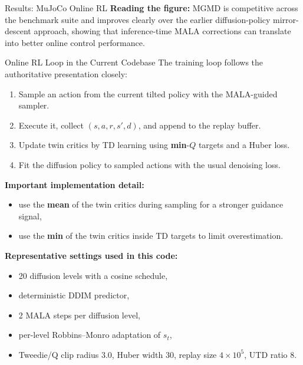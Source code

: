 \documentclass[final,hyperref={pdfpagelabels=false}]{beamer}
\newlength{\colwidth}
\begin{document}
\begin{frame}[t]
\begin{columns}[t]
\begin{column}{\colwidth}
\begin{block}{\Large Results: MuJoCo Online RL}
 \vspace{0.3em}
 \textbf{Reading the figure:}
 MGMD is competitive across the benchmark suite and improves clearly over the earlier diffusion-policy mirror-descent approach, showing that inference-time MALA corrections can translate into better online control performance.
 \end{block}
 
 \vspace{0.8cm}
 
 \begin{block}{\Large Online RL Loop in the Current Codebase}
 \small
 The training loop follows the authoritative presentation closely:
 \begin{enumerate}
      \item Sample an action from the current tilted policy with the MALA-guided sampler.
      \item Execute it, collect $(s,a,r,s',d)$, and append to the replay buffer.
      \item Update twin critics by TD learning using \textbf{min}-$Q$ targets and a Huber loss.
      \item Fit the diffusion policy to sampled actions with the usual denoising loss.
 \end{enumerate}
 
 \vspace{0.3em}
 \textbf{Important implementation detail:}
 \begin{itemize}
     \item use the \textbf{mean} of the twin critics during sampling for a stronger guidance signal,
     \item use the \textbf{min} of the twin critics inside TD targets to limit overestimation.
 \end{itemize}
 
 \vspace{0.3em}
 \textbf{Representative settings used in this code:}
 \begin{itemize}
     \item 20 diffusion levels with a cosine schedule,
     \item deterministic DDIM predictor,
     \item 2 MALA steps per diffusion level,
     \item per-level Robbins--Monro adaptation of $s_t$,
     \item Tweedie/Q clip radius $3.0$, Huber width $30$, replay size $4\times 10^5$, UTD ratio $8$.
 \end{itemize}
 \end{block}
 

\end{column}
\end{columns}
\end{frame}
\end{document}
